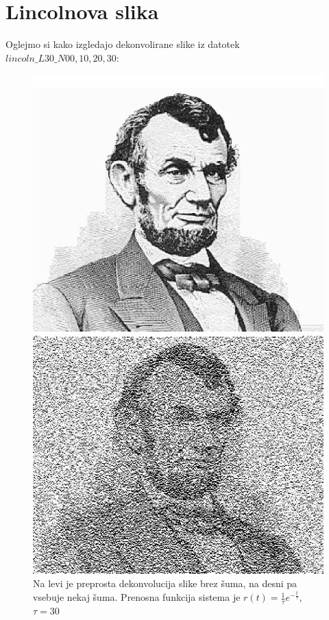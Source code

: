 \documentclass[slovene,11pt,a4paper]{article}
\numberwithin{equation}{section} %
\numberwithin{figure}{section} %
\numberwithin{table}{section} %
\begin{document}
\pagebreak
\section{Lincolnova slika}
Oglejmo si kako izgledajo dekonvolirane slike iz datotek $lincoln\_L30\_N{00,10,20,30}$:

\begin{figure}[h]
\centering
\begin{minipage}{0.5\textwidth}
\centering
\includegraphics[scale=0.4]{slike/lincon1.png}
\end{minipage}\hfill
\begin{minipage}{0.5\textwidth}
\centering
\includegraphics[scale=0.4]{slike/lincon2.png}
\end{minipage}
\caption{Na levi je preprosta dekonvolucija slike brez šuma, na desni pa vsebuje nekaj šuma. Prenosna funkcija sistema je $r(t)=\frac{1}{\tau}e^{-\frac{t}{\tau}}$, $\tau=30$}
\end{figure}
\end{document}
